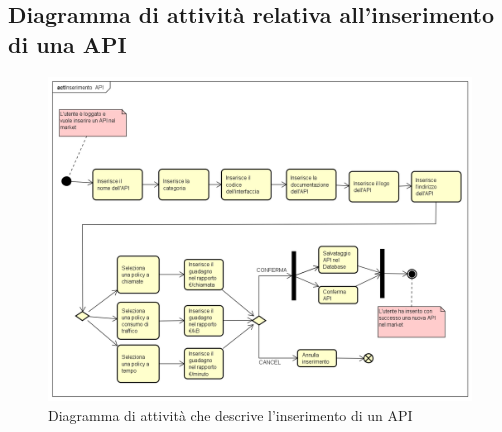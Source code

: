 \newpage
\subsection{Diagramma di attività relativa all'inserimento di una API}
\begin{figure}[h]
	\centering
	\includegraphics[width=1.0\linewidth]{IMG/Inserimento_API}
	\caption{Diagramma di attività che descrive l'inserimento di un API}
	\label{fig:inserimentoapi}
\end{figure}


